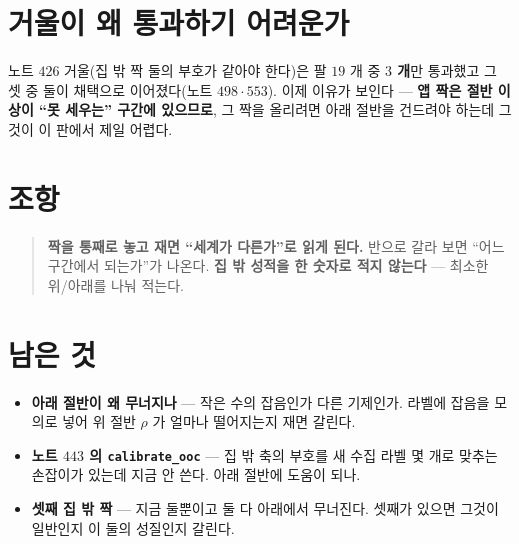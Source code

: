 \documentclass[11pt]{article}
\begin{document}
\section*{거울이 왜 통과하기 어려운가}

노트 $426$ 거울(집 밖 짝 둘의 부호가 같아야 한다)은 팔 $19$ 개 중
\textbf{$3$ 개}만 통과했고 그 셋 중 둘이 채택으로 이어졌다(노트 $498 \cdot
553$). 이제 이유가 보인다 --- \textbf{앱 짝은 절반 이상이 ``못 세우는''
구간에 있으므로}, 그 짝을 올리려면 아래 절반을 건드려야 하는데 그것이 이
판에서 제일 어렵다.

\section*{조항}

\begin{quote}
\textbf{짝을 통째로 놓고 재면 ``세계가 다른가''로 읽게 된다.} 반으로 갈라
보면 ``어느 구간에서 되는가''가 나온다. \textbf{집 밖 성적을 한 숫자로
적지 않는다} --- 최소한 위/아래를 나눠 적는다.
\end{quote}

\section*{남은 것}

\begin{itemize}
\item \textbf{아래 절반이 왜 무너지나} --- 작은 수의 잡음인가 다른 기제인가.
라벨에 잡음을 모의로 넣어 위 절반 $\rho$ 가 얼마나 떨어지는지 재면 갈린다.
\item \textbf{노트 $443$ 의 \texttt{calibrate\_ooc}} --- 집 밖 축의 부호를
새 수집 라벨 몇 개로 맞추는 손잡이가 있는데 지금 안 쓴다. 아래 절반에
도움이 되나.
\item \textbf{셋째 집 밖 짝} --- 지금 둘뿐이고 둘 다 아래에서 무너진다.
셋째가 있으면 그것이 일반인지 이 둘의 성질인지 갈린다.
\end{itemize}
\end{document}
